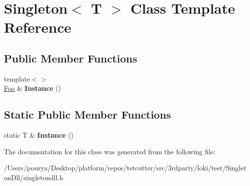 \hypertarget{classSingleton}{}\section{Singleton$<$ T $>$ Class Template Reference}
\label{classSingleton}
\subsection*{Public Member Functions}
\begin{DoxyCompactItemize}
\item 
\hypertarget{classSingleton_ae15e5c5d918686088f2c84ffc6b6fb84}{}{\footnotesize template$<$$>$ }\\\hyperlink{structFoo}{Foo} \& {\bfseries Instance} ()\label{classSingleton_ae15e5c5d918686088f2c84ffc6b6fb84}

\end{DoxyCompactItemize}
\subsection*{Static Public Member Functions}
\begin{DoxyCompactItemize}
\item 
\hypertarget{classSingleton_a131e87528259529400d58b6df5d9743c}{}static T \& {\bfseries Instance} ()\label{classSingleton_a131e87528259529400d58b6df5d9743c}

\end{DoxyCompactItemize}


The documentation for this class was generated from the following file\+:\begin{DoxyCompactItemize}
\item 
/\+Users/pourya/\+Desktop/platform/repos/tetcutter/src/3rdparty/loki/test/\+Singleton\+Dll/singletondll.\+h\end{DoxyCompactItemize}
